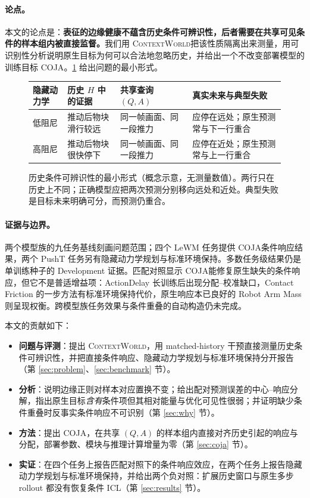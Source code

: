 \documentclass[UTF8,zihao=-4,fontset=fandol]{ctexart}
\renewcommand{\arraystretch}{1.18}
\newcommand{\method}{\textsc{COJA}}
\newcommand{\benchmark}{\textsc{ContextWorld}}
\begin{document}
\paragraph{论点。}
本文的论点是：\textbf{表征的边缘健康不蕴含历史条件可辨识性，后者需要在共享可见条件的样本组内被直接监督。}我们用 \benchmark 把该性质隔离出来测量，用可识别性分析说明原生目标为何可以合法地忽略历史，并给出一个不改变部署模型的训练目标 \method。\cref{fig:overview} 给出问题的最小形式。

\begin{figure}[t]
\centering
\footnotesize
\setlength{\tabcolsep}{5pt}
\renewcommand{\arraystretch}{1.3}
\begin{tabularx}{\textwidth}{@{}p{2.0cm}p{3.4cm}p{3.0cm}Y@{}}
\toprule
隐藏动力学 & 历史 $H$ 中的证据 & 共享查询 $(Q,A)$ & 真实未来与典型失败 \\
\midrule
低阻尼 & 推动后物块滑行较远 & 同一帧画面、同一段推力 & 应停在远处；原生预测常与下一行重合 \\
高阻尼 & 推动后物块很快停下 & 同一帧画面、同一段推力 & 应停在近处；原生预测常与上一行重合 \\
\bottomrule
\end{tabularx}
\caption{历史条件可辨识性的最小形式（概念示意，无测量数值）。两行只在历史上不同；正确模型应把两次预测分别移向远处和近处。典型失败是目标未来明确可分，而预测仍重合。}
\label{fig:overview}
\end{figure}

\paragraph{证据与边界。}
两个模型族的九任务基线刻画问题范围；四个 LeWM 任务提供 \method 条件响应结果，两个 PushT 任务另有隐藏动力学规划与标准环境保持。多数任务级结果仍是单训练种子的 Development 证据。匹配对照显示 \method 能修复原生缺失的条件响应，但它不是普适增益项：ActionDelay 长训练后出现分配--校准缺口，Contact Friction 的一步方法有标准环境保持代价，原生响应本已良好的 Robot Arm Mass 则呈现权衡。跨模型族任务效果与条件重叠的自动构造仍未完成。

本文的贡献如下：

\begin{itemize}
  \item \textbf{问题与评测}：提出 \benchmark，用 matched-history 干预直接测量历史条件可辨识性，并把直接条件响应、隐藏动力学规划与标准环境保持分开报告（第 \ref{sec:problem}、\ref{sec:benchmark} 节）。
  \item \textbf{分析}：说明边缘正则对样本对应置换不变；给出配对预测误差的中心--响应分解，指出原生目标\emph{含有}条件项但其相对能量与优化可见性很弱；并证明缺少条件重叠时反事实条件响应不可识别（第 \ref{sec:why} 节）。
  \item \textbf{方法}：提出 \method，在共享 $(Q,A)$ 的样本组内直接对齐历史引起的响应与分配，部署参数、模块与推理计算增量为零（第 \ref{sec:coja} 节）。
  \item \textbf{实证}：在四个任务上报告匹配对照下的条件响应效应，在两个任务上报告隐藏动力学规划与标准环境保持，并给出两个负对照：扩展历史窗口与原生多步 rollout 都没有恢复条件 ICL（第 \ref{sec:results} 节）。
\end{itemize}
\end{document}
